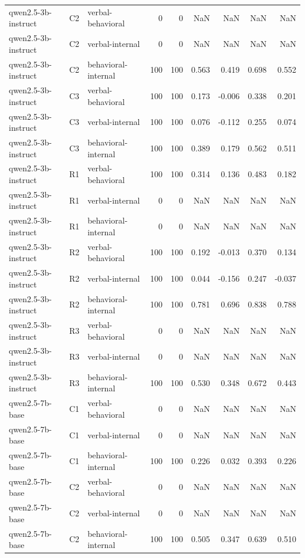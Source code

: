 \begin{table}
\begin{tabular}{lllrrrrrr}
qwen2.5-3b-instruct & C2 & verbal-behavioral & 0 & 0 & NaN & NaN & NaN & NaN \\
qwen2.5-3b-instruct & C2 & verbal-internal & 0 & 0 & NaN & NaN & NaN & NaN \\
qwen2.5-3b-instruct & C2 & behavioral-internal & 100 & 100 & 0.563 & 0.419 & 0.698 & 0.552 \\
qwen2.5-3b-instruct & C3 & verbal-behavioral & 100 & 100 & 0.173 & -0.006 & 0.338 & 0.201 \\
qwen2.5-3b-instruct & C3 & verbal-internal & 100 & 100 & 0.076 & -0.112 & 0.255 & 0.074 \\
qwen2.5-3b-instruct & C3 & behavioral-internal & 100 & 100 & 0.389 & 0.179 & 0.562 & 0.511 \\
qwen2.5-3b-instruct & R1 & verbal-behavioral & 100 & 100 & 0.314 & 0.136 & 0.483 & 0.182 \\
qwen2.5-3b-instruct & R1 & verbal-internal & 0 & 0 & NaN & NaN & NaN & NaN \\
qwen2.5-3b-instruct & R1 & behavioral-internal & 0 & 0 & NaN & NaN & NaN & NaN \\
qwen2.5-3b-instruct & R2 & verbal-behavioral & 100 & 100 & 0.192 & -0.013 & 0.370 & 0.134 \\
qwen2.5-3b-instruct & R2 & verbal-internal & 100 & 100 & 0.044 & -0.156 & 0.247 & -0.037 \\
qwen2.5-3b-instruct & R2 & behavioral-internal & 100 & 100 & 0.781 & 0.696 & 0.838 & 0.788 \\
qwen2.5-3b-instruct & R3 & verbal-behavioral & 0 & 0 & NaN & NaN & NaN & NaN \\
qwen2.5-3b-instruct & R3 & verbal-internal & 0 & 0 & NaN & NaN & NaN & NaN \\
qwen2.5-3b-instruct & R3 & behavioral-internal & 100 & 100 & 0.530 & 0.348 & 0.672 & 0.443 \\
qwen2.5-7b-base & C1 & verbal-behavioral & 0 & 0 & NaN & NaN & NaN & NaN \\
qwen2.5-7b-base & C1 & verbal-internal & 0 & 0 & NaN & NaN & NaN & NaN \\
qwen2.5-7b-base & C1 & behavioral-internal & 100 & 100 & 0.226 & 0.032 & 0.393 & 0.226 \\
qwen2.5-7b-base & C2 & verbal-behavioral & 0 & 0 & NaN & NaN & NaN & NaN \\
qwen2.5-7b-base & C2 & verbal-internal & 0 & 0 & NaN & NaN & NaN & NaN \\
qwen2.5-7b-base & C2 & behavioral-internal & 100 & 100 & 0.505 & 0.347 & 0.639 & 0.510 \\

\end{tabular}
\end{table}
